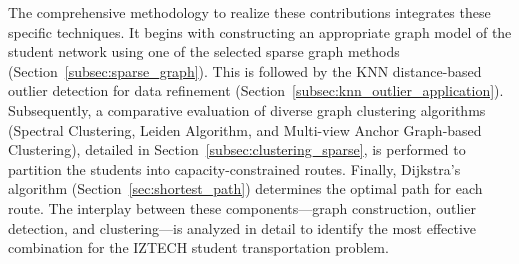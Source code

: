 The comprehensive methodology to realize these contributions integrates these specific techniques. It begins with constructing an appropriate graph model of the student network using one of the selected sparse graph methods (Section~\ref{subsec:sparse_graph}). This is followed by the KNN distance-based outlier detection for data refinement (Section~\ref{subsec:knn_outlier_application}). Subsequently, a comparative evaluation of diverse graph clustering algorithms (Spectral Clustering, Leiden Algorithm, and Multi-view Anchor Graph-based Clustering), detailed in Section~\ref{subsec:clustering_sparse}, is performed to partition the students into capacity-constrained routes. Finally, Dijkstra's algorithm (Section~\ref{sec:shortest_path}) determines the optimal path for each route. The interplay between these components—graph construction, outlier detection, and clustering—is analyzed in detail to identify the most effective combination for the IZTECH student transportation problem.

